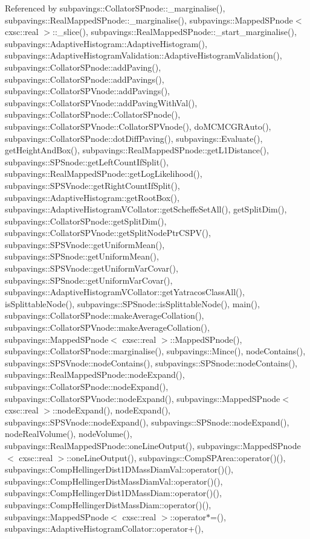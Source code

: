 \-Referenced by subpavings\-::\-Collator\-S\-Pnode\-::\-\_\-marginalise(), subpavings\-::\-Real\-Mapped\-S\-Pnode\-::\-\_\-marginalise(), subpavings\-::\-Mapped\-S\-Pnode$<$ cxsc\-::real $>$\-::\-\_\-slice(), subpavings\-::\-Real\-Mapped\-S\-Pnode\-::\-\_\-start\-\_\-marginalise(), subpavings\-::\-Adaptive\-Histogram\-::\-Adaptive\-Histogram(), subpavings\-::\-Adaptive\-Histogram\-Validation\-::\-Adaptive\-Histogram\-Validation(), subpavings\-::\-Collator\-S\-Pnode\-::add\-Paving(), subpavings\-::\-Collator\-S\-Pnode\-::add\-Pavings(), subpavings\-::\-Collator\-S\-P\-Vnode\-::add\-Pavings(), subpavings\-::\-Collator\-S\-P\-Vnode\-::add\-Paving\-With\-Val(), subpavings\-::\-Collator\-S\-Pnode\-::\-Collator\-S\-Pnode(), subpavings\-::\-Collator\-S\-P\-Vnode\-::\-Collator\-S\-P\-Vnode(), do\-M\-C\-M\-C\-G\-R\-Auto(), subpavings\-::\-Collator\-S\-Pnode\-::dot\-Diff\-Paving(), subpavings\-::\-Evaluate(), get\-Height\-And\-Box(), subpavings\-::\-Real\-Mapped\-S\-Pnode\-::get\-L1\-Distance(), subpavings\-::\-S\-P\-Snode\-::get\-Left\-Count\-If\-Split(), subpavings\-::\-Real\-Mapped\-S\-Pnode\-::get\-Log\-Likelihood(), subpavings\-::\-S\-P\-S\-Vnode\-::get\-Right\-Count\-If\-Split(), subpavings\-::\-Adaptive\-Histogram\-::get\-Root\-Box(), subpavings\-::\-Adaptive\-Histogram\-V\-Collator\-::get\-Scheffe\-Set\-All(), get\-Split\-Dim(), subpavings\-::\-Collator\-S\-Pnode\-::get\-Split\-Dim(), subpavings\-::\-Collator\-S\-P\-Vnode\-::get\-Split\-Node\-Ptr\-C\-S\-P\-V(), subpavings\-::\-S\-P\-S\-Vnode\-::get\-Uniform\-Mean(), subpavings\-::\-S\-P\-Snode\-::get\-Uniform\-Mean(), subpavings\-::\-S\-P\-S\-Vnode\-::get\-Uniform\-Var\-Covar(), subpavings\-::\-S\-P\-Snode\-::get\-Uniform\-Var\-Covar(), subpavings\-::\-Adaptive\-Histogram\-V\-Collator\-::get\-Yatracos\-Class\-All(), is\-Splittable\-Node(), subpavings\-::\-S\-P\-Snode\-::is\-Splittable\-Node(), main(), subpavings\-::\-Collator\-S\-Pnode\-::make\-Average\-Collation(), subpavings\-::\-Collator\-S\-P\-Vnode\-::make\-Average\-Collation(), subpavings\-::\-Mapped\-S\-Pnode$<$ cxsc\-::real $>$\-::\-Mapped\-S\-Pnode(), subpavings\-::\-Collator\-S\-Pnode\-::marginalise(), subpavings\-::\-Mince(), node\-Contains(), subpavings\-::\-S\-P\-S\-Vnode\-::node\-Contains(), subpavings\-::\-S\-P\-Snode\-::node\-Contains(), subpavings\-::\-Real\-Mapped\-S\-Pnode\-::node\-Expand(), subpavings\-::\-Collator\-S\-Pnode\-::node\-Expand(), subpavings\-::\-Collator\-S\-P\-Vnode\-::node\-Expand(), subpavings\-::\-Mapped\-S\-Pnode$<$ cxsc\-::real $>$\-::node\-Expand(), node\-Expand(), subpavings\-::\-S\-P\-S\-Vnode\-::node\-Expand(), subpavings\-::\-S\-P\-Snode\-::node\-Expand(), node\-Real\-Volume(), node\-Volume(), subpavings\-::\-Real\-Mapped\-S\-Pnode\-::one\-Line\-Output(), subpavings\-::\-Mapped\-S\-Pnode$<$ cxsc\-::real $>$\-::one\-Line\-Output(), subpavings\-::\-Comp\-S\-P\-Area\-::operator()(), subpavings\-::\-Comp\-Hellinger\-Dist1\-D\-Mass\-Diam\-Val\-::operator()(), subpavings\-::\-Comp\-Hellinger\-Dist\-Mass\-Diam\-Val\-::operator()(), subpavings\-::\-Comp\-Hellinger\-Dist1\-D\-Mass\-Diam\-::operator()(), subpavings\-::\-Comp\-Hellinger\-Dist\-Mass\-Diam\-::operator()(), subpavings\-::\-Mapped\-S\-Pnode$<$ cxsc\-::real $>$\-::operator$\ast$=(), subpavings\-::\-Adaptive\-Histogram\-Collator\-::operator+(), 